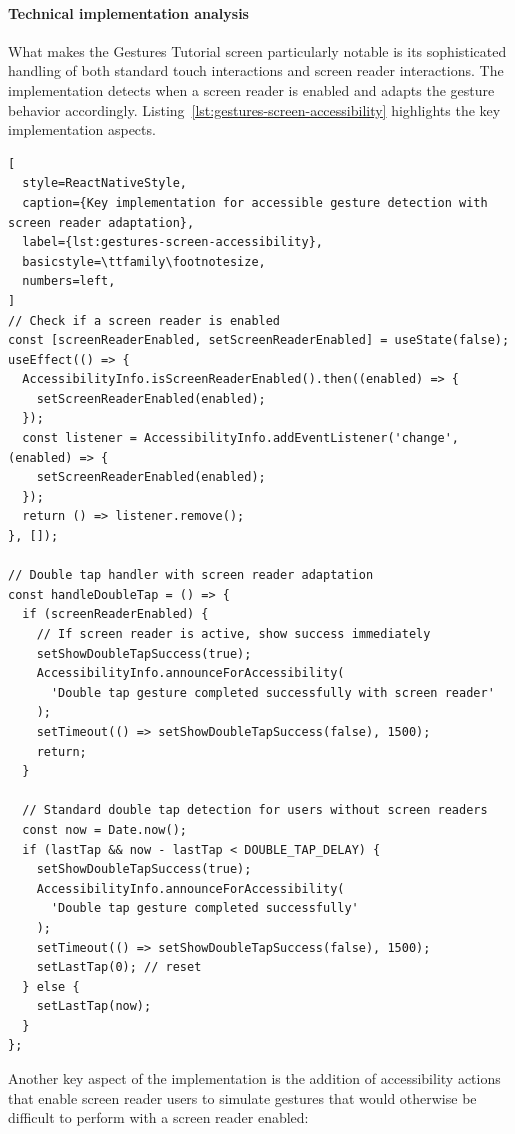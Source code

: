 \paragraph{Technical implementation analysis}

What makes the Gestures Tutorial screen particularly notable is its sophisticated handling of both standard touch interactions and screen reader interactions. The implementation detects when a screen reader is enabled and adapts the gesture behavior accordingly. Listing~\ref{lst:gestures-screen-accessibility} highlights the key implementation aspects.

\begin{lstlisting}[
  style=ReactNativeStyle,
  caption={Key implementation for accessible gesture detection with screen reader adaptation},
  label={lst:gestures-screen-accessibility},
  basicstyle=\ttfamily\footnotesize,
  numbers=left,
]
// Check if a screen reader is enabled
const [screenReaderEnabled, setScreenReaderEnabled] = useState(false);
useEffect(() => {
  AccessibilityInfo.isScreenReaderEnabled().then((enabled) => {
    setScreenReaderEnabled(enabled);
  });
  const listener = AccessibilityInfo.addEventListener('change', (enabled) => {
    setScreenReaderEnabled(enabled);
  });
  return () => listener.remove();
}, []);

// Double tap handler with screen reader adaptation
const handleDoubleTap = () => {
  if (screenReaderEnabled) {
    // If screen reader is active, show success immediately
    setShowDoubleTapSuccess(true);
    AccessibilityInfo.announceForAccessibility(
      'Double tap gesture completed successfully with screen reader'
    );
    setTimeout(() => setShowDoubleTapSuccess(false), 1500);
    return;
  }

  // Standard double tap detection for users without screen readers
  const now = Date.now();
  if (lastTap && now - lastTap < DOUBLE_TAP_DELAY) {
    setShowDoubleTapSuccess(true);
    AccessibilityInfo.announceForAccessibility(
      'Double tap gesture completed successfully'
    );
    setTimeout(() => setShowDoubleTapSuccess(false), 1500);
    setLastTap(0); // reset
  } else {
    setLastTap(now);
  }
};
\end{lstlisting}

Another key aspect of the implementation is the addition of accessibility actions that enable screen reader users to simulate gestures that would otherwise be difficult to perform with a screen reader enabled:

